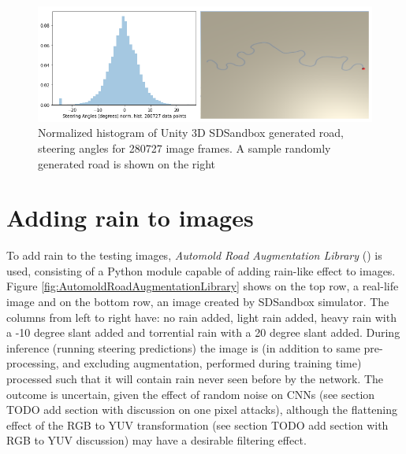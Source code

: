 \begin{figure}[ht]
 \centering 
 \includegraphics[width=\textwidth]{Figures/GeneratedRoadPlusHistogram.png}
 \caption{Normalized histogram of Unity 3D SDSandbox generated road, steering angles for 280727 image frames. A sample randomly generated road is shown on the right}
 \label{fig:GeneratedRoadPlusHist}
\end{figure}


\section{Adding rain to images}
To add rain to the testing images, \textit{Automold Road Augmentation Library} (\cite{Saxena2017}) is used, consisting of a Python module capable of adding rain-like effect to images. Figure \ref{fig:AutomoldRoadAugmentationLibrary} shows on the top row, a real-life image and on the bottom row, an image created by SDSandbox simulator. The columns from left to right have: no rain added, light rain added, heavy rain with a -10 degree slant added and torrential rain with a 20 degree slant added.  
During inference (running steering predictions) the image is (in addition to same pre-processing, and excluding augmentation, performed during training time) processed such that it will contain rain never seen before by the network. The outcome is uncertain, given the effect of random noise on CNNs (see section TODO add section with discussion on one pixel attacks), although the flattening effect of the RGB to YUV transformation (see section TODO add section with RGB to YUV discussion) may have a desirable filtering effect.

